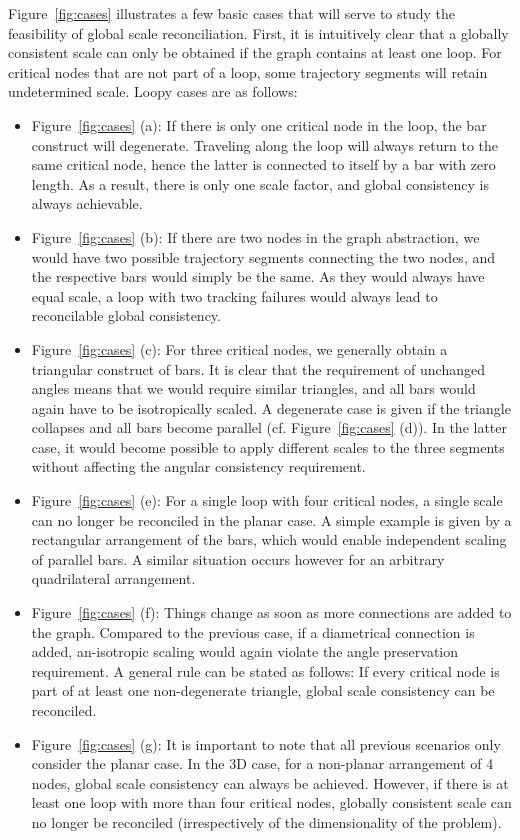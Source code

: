 \documentclass[letterpaper, 10 pt, conference]{ieeeconf}  %
\begin{document}
Figure~\ref{fig:cases} illustrates a few basic cases that will serve to study the feasibility of global scale reconciliation.  First, it is intuitively clear that a globally consistent scale can only be obtained if the graph contains at least one loop. For critical nodes that are not part of a loop, some trajectory segments will retain undetermined scale. Loopy cases are as follows:
%
\begin{itemize}
    \item Figure~\ref{fig:cases} (a): If there is only one critical node in the loop, the bar construct will degenerate. Traveling along the loop will always return to the same critical node, hence the latter is connected to itself by a bar with zero length. As a result, there is only one scale factor, and global consistency is always achievable.
    \item Figure~\ref{fig:cases} (b): If there are two nodes in the graph abstraction, we would have two possible trajectory segments connecting the two nodes, and the respective bars would simply be the same. As they would always have equal scale, a loop with two tracking failures would always lead to reconcilable global consistency.
    \item Figure~\ref{fig:cases} (c): For three critical nodes, we generally obtain a triangular construct of bars. It is clear that the requirement of unchanged angles means that we would require similar triangles, and all bars would again have to be isotropically scaled. A degenerate case is given if the triangle collapses and all bars become parallel (cf. Figure~\ref{fig:cases} (d)). In the latter case, it would become possible to apply different scales to the three segments without affecting the angular consistency requirement.
    \item Figure~\ref{fig:cases} (e): For a single loop with four critical nodes, a single scale can no longer be reconciled in the planar case. A simple example is given by a rectangular arrangement of the bars, which would enable independent scaling of parallel bars. A similar situation occurs however for an arbitrary quadrilateral arrangement.
    \item Figure~\ref{fig:cases} (f): Things change as soon as more connections are added to the graph. Compared to the previous case, if a diametrical connection is added, an-isotropic scaling would again violate the angle preservation requirement. A general rule can be stated as follows: If every critical node is part of at least one non-degenerate triangle, global scale consistency can be reconciled.
    \item Figure~\ref{fig:cases} (g): It is important to note that all previous scenarios only consider the planar case. In the 3D case, for a non-planar arrangement of 4 nodes, global scale consistency can always be achieved. However, if there is at least one loop with more than four critical nodes, globally consistent scale can no longer be reconciled (irrespectively of the dimensionality of the problem).
\end{itemize}
\end{document}
